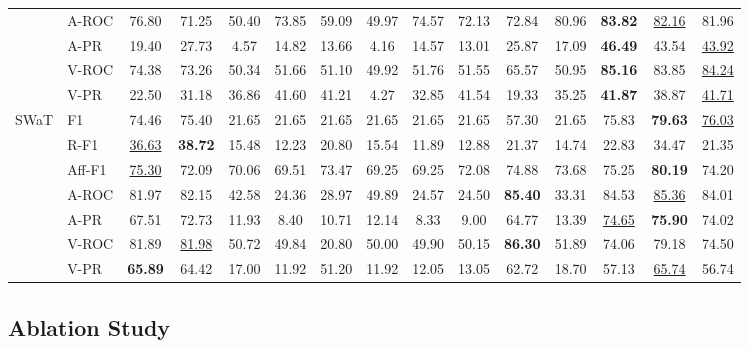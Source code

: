 \documentclass[letterpaper]{article}
\begin{document}
\begin{table}[t]
{\begin{tabular}{ll|cccccccccc|ccc}
 & A-ROC & 76.80 & 71.25 & 50.40 & 73.85 & 59.09 & 49.97 & 74.57 & 72.13 & 72.84 & 80.96 & \textbf{83.82} & \underline{82.16} & 81.96 \\
 & A-PR & 19.40 & 27.73 & 4.57 & 14.82 & 13.66 & 4.16 & 14.57 & 13.01 & 25.87 & 17.09 & \textbf{46.49} & 43.54 & \underline{43.92} \\
 & V-ROC & 74.38 & 73.26 & 50.34 & 51.66 & 51.10 & 49.92 & 51.76 & 51.55 & 65.57 & 50.95 & \textbf{85.16} & 83.85 & \underline{84.24} \\
 & V-PR & 22.50 & 31.18 & 36.86 & 41.60 & 41.21 & 4.27 & 32.85 & 41.54 & 19.33 & 35.25 & \textbf{41.87} & 38.87 & \underline{41.71} \\
\midrule
\multirow{7}{*}{SWaT} & F1 & 74.46 & 75.40 & 21.65 & 21.65 & 21.65 & 21.65 & 21.65 & 21.65 & 57.30 & 21.65 & 75.83 & \textbf{79.63} & \underline{76.03} \\
 & R-F1 & \underline{36.63} & \textbf{38.72} & 15.48 & 12.23 & 20.80 & 15.54 & 11.89 & 12.88 & 21.37 & 14.74 & 22.83 & 34.47 & 21.35 \\
 & Aff-F1 & \underline{75.30} & 72.09 & 70.06 & 69.51 & 73.47 & 69.25 & 69.25 & 72.08 & 74.88 & 73.68 & 75.25 & \textbf{80.19} & 74.20 \\
 & A-ROC & 81.97 & 82.15 & 42.58 & 24.36 & 28.97 & 49.89 & 24.57 & 24.50 & \textbf{85.40} & 33.31 & 84.53 & \underline{85.36} & 84.01 \\
 & A-PR & 67.51 & 72.73 & 11.93 & 8.40 & 10.71 & 12.14 & 8.33 & 9.00 & 64.77 & 13.39 & \underline{74.65} & \textbf{75.90} & 74.02 \\
 & V-ROC & 81.89 & \underline{81.98} & 50.72 & 49.84 & 20.80 & 50.00 & 49.90 & 50.15 & \textbf{86.30} & 51.89 & 74.06 & 79.18 & 74.50 \\
 & V-PR & \textbf{65.89} & 64.42 & 17.00 & 11.92 & 51.20 & 11.92 & 12.05 & 13.05 & 62.72 & 18.70 & 57.13 & \underline{65.74} & 56.74 \\
\bottomrule
\end{tabular}}
\end{table}

\subsection{Ablation Study}
\label{sec:ablation}
\end{document}

